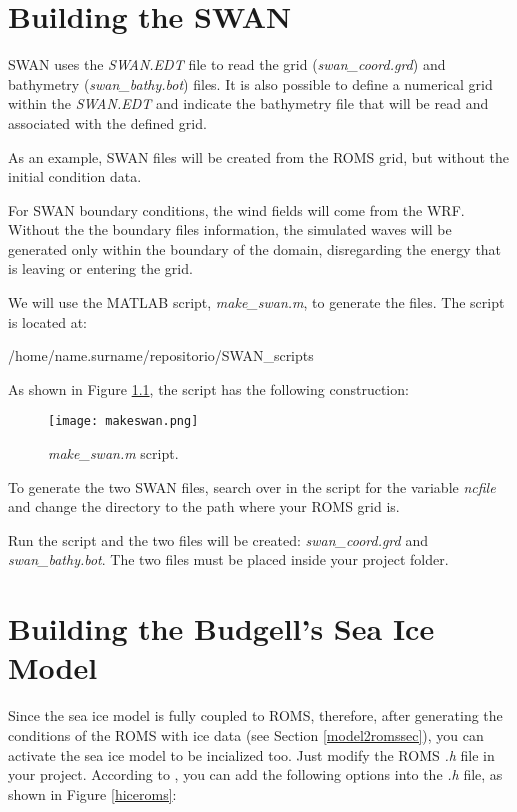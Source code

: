 \bigskip
\chapter{Building the SWAN}

 SWAN uses the \textit{SWAN.EDT} file to read the grid (\textit{swan\_coord.grd}) and bathymetry (\textit{swan\_bathy.bot}) files. 
It is also possible to define a numerical grid within the \textit{SWAN.EDT} and indicate the bathymetry file that will be read and associated 
with the defined grid.
\bigskip

 As an example, SWAN files will be created from the ROMS grid, but without the initial condition data.
\bigskip

 For SWAN boundary conditions, the wind fields will come from the WRF. Without the
the boundary files information, the simulated waves will be generated only within the boundary of the domain, disregarding the energy that
is leaving or entering the grid.
\bigskip

 We will use the MATLAB script, \textit{make\_swan.m}, to generate the files. The script is located at:
\bigskip

\begin{bashcode}
/home/name.surname/repositorio/SWAN_scripts
\end{bashcode}
\bigskip

 As shown in Figure \textcolor{bleu_cite}{\ref{makeswan}}, the script has the following construction:
\bigskip

\begin{figure}[H]
    \centering
    \texttt{[image: makeswan.png]}
    \caption{\textit{make\_swan.m} script.}
    \label{makeswan}
\end{figure}
\bigskip

 To generate the two SWAN files, search over in the script for the variable \textit{ncfile} and change the directory
to the path where your ROMS grid is.
\bigskip

 Run the script and the two files will be created: \textit{swan\_coord.grd} and \textit{swan\_bathy.bot}.
The two files must be placed inside your project folder.
\bigskip

\chapter{Building the Budgell's Sea Ice Model}
\bigskip

Since the sea ice model is fully coupled to ROMS, therefore, after generating the conditions of the
ROMS with ice data (see Section \textcolor{bleu_cite}{\ref{model2romssec}}), you can activate the sea ice model to be incialized too.
Just modify the ROMS \textit{.h} file in your project. According to \textcite{hedstrom2018}, you can
add the following options into the \textit{.h} file, as shown in Figure \textcolor{bleu_cite}{\ref{hiceroms}}:
\bigskip


